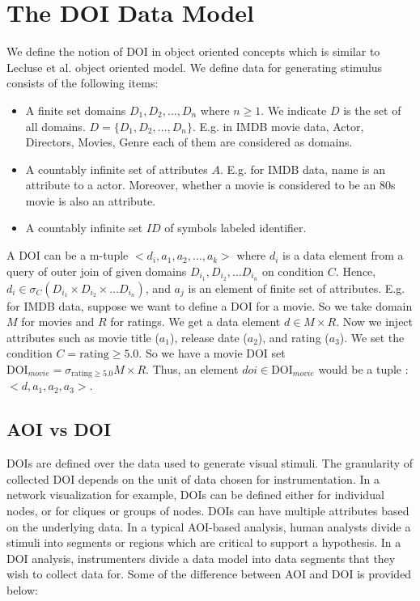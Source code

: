 \section{The DOI Data Model}

We define the notion of DOI in object oriented concepts which is similar to Lecluse et al. \cite{lecluse1988o2} object oriented model. 
We define data for generating stimulus consists of the following items:
\begin{itemize}
	\item A finite set domains $D_1, D_2, \ldots, D_n$ where $n \geq 1$. We indicate $D$ is the set of all domains. $D = \{D_1, D_2, \ldots, D_n\}$. E.g. in IMDB movie data, Actor, Directors, Movies, Genre each of them are considered as domains.
	\item A countably infinite set of attributes $A$. E.g. for IMDB data, name is an attribute to a actor. Moreover, whether a movie is considered to be an 80s movie is also an attribute. 
	\item A countably infinite set $ID$ of symbols labeled identifier. 
\end{itemize}

A DOI can be a m-tuple $<d_i, a_1 , a_2, \ldots, a_k>$ where $d_i$ is a data element from a query of outer join of given domains $D_{i_1}, D_{i_2}, \ldots D_{i_n}$ on condition $C$. Hence, $d_i \in \sigma _{C} (D_{i_1} \times D_{i_2} \times \ldots D_{i_n})$, and $a_j$ is an element of finite set of attributes. E.g. for IMDB data, suppose we want to define a DOI for a movie. So we take domain $M$ for movies and $R$ for ratings. We get a data element $d \in M \times R$. Now we inject attributes such as movie title ($a_1$), release date ($a_2$), and rating ($a_3$). We set the condition $C= \text{rating} \geq 5.0$. So we have a movie DOI set $\text{DOI}_{movie} = \sigma_{\text{rating} \geq 5.0} M \times R$. Thus, an element $doi \in \text{DOI}_{movie}$ would be a tuple : $<d, a_1, a_2, a_3>$. 

\subsection{AOI vs DOI}

DOIs are defined over the data used to generate visual stimuli. The granularity of collected DOI depends on the unit of data chosen for instrumentation. In a network visualization for example, DOIs can be defined either for individual nodes, or for cliques or groups of nodes. DOIs can have multiple attributes based on the underlying data. 
In a typical AOI-based analysis, human analysts divide a stimuli into segments or regions which are critical to support a hypothesis. In a DOI analysis, instrumenters divide a data model into data segments that they wish to collect data for. Some of the difference between AOI and DOI is provided below: 

